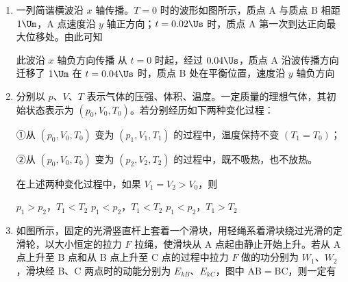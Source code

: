 \documentclass[\gkver]{gaokaozhenti}
\begin{document}
\begin{enumerate}
{当分子力表现为引力时，分子力和分子势能总是随分子间距离的增大而减小}
{当分子力表现为斥力时，分子力和分子势能总是随分子间距离的减小而增大}
{当分子力表现为斥力时，分子力和分子势能总是随分子间距离的减小而减小}


\item
一列简谐横波沿 $x$ 轴传播。$T=0$ 时的波形如图所示，质点 A 与质点 B 相距 $1\Um$，A 点速度沿 $y$ 轴正方向；$t=0.02\Us$ 时，质点 A 第一次到达正向最大位移处。由此可知


{此波沿 $x$ 轴负方向传播}
{从 $t=0$ 时起，经过 $0.04\Us$，质点 A 沿波传播方向迁移了 $1\Um$}
{在 $t=0.04\Us$ 时，质点 B 处在平衡位置，速度沿 $y$ 轴负方向}


\item
分别以 $p$、$V$、$T$ 表示气体的压强、体积、温度。一定质量的理想气体，其初始状态表示为 $(p_{0}, V_{0}, T_{0})$。若分别经历如下两种变化过程：

①从 $(p_{0}, V_{0}, T_{0})$ 变为 $(p_{1}, V_{1}, T_{1})$ 的过程中，温度保持不变 $(T_{1}=T_{0})$；

②从 $(p_{0}, V_{0}, T_{0})$ 变为 $(p_{2}, V_{2}, T_{2})$ 的过程中，既不吸热，也不放热。

在上述两种变化过程中，如果 $V_{1}=V_{2}>V_{0}$，则

{$p_{1}>p_{2}$，$T_{1}<T_{2}$}
{$p_{1}<p_{2}$，$T_{1}<T_{2}$}
{$p_{1}<p_{2}$，$T_{1}>T_{2}$}


\item
如图所示，固定的光滑竖直杆上套着一个滑块，用轻绳系着滑块绕过光滑的定滑轮，以大小恒定的拉力 $F$ 拉绳，使滑块从 A 点起由静止开始上升。若从 A 点上升至 B 点和从 B 点上升至 C 点的过程中拉力 $F$ 做的功分别为 $W_{1}$、$W_{2}$，滑块经 B、C 两点时的动能分别为 $E_{kB}$、$E_{kC}$，图中 AB$=$BC，则一定有


\end{enumerate}
\end{document}
